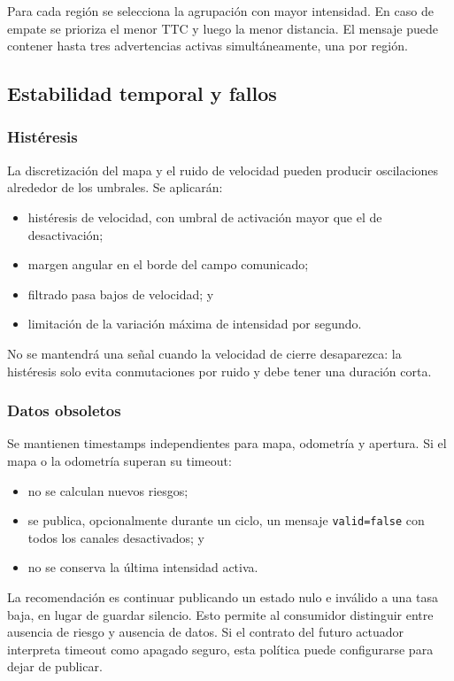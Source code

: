 Para cada región se selecciona la agrupación con mayor intensidad. En caso de
empate se prioriza el menor TTC y luego la menor distancia. El mensaje puede
contener hasta tres advertencias activas simultáneamente, una por región.

\subsection{Estabilidad temporal y fallos}
\label{subsec:sa-robustness}

\subsubsection{Histéresis}

La discretización del mapa y el ruido de velocidad pueden producir
oscilaciones alrededor de los umbrales. Se aplicarán:
%
\begin{itemize}
  \item histéresis de velocidad, con umbral de activación mayor que el de
    desactivación;
  \item margen angular en el borde del campo comunicado;
  \item filtrado pasa bajos de velocidad; y
  \item limitación de la variación máxima de intensidad por segundo.
\end{itemize}

No se mantendrá una señal cuando la velocidad de cierre desaparezca: la
histéresis solo evita conmutaciones por ruido y debe tener una duración corta.

\subsubsection{Datos obsoletos}

Se mantienen timestamps independientes para mapa, odometría y apertura. Si el
mapa o la odometría superan su timeout:
%
\begin{itemize}
  \item no se calculan nuevos riesgos;
  \item se publica, opcionalmente durante un ciclo, un mensaje
    \texttt{valid=false} con todos los canales desactivados; y
  \item no se conserva la última intensidad activa.
\end{itemize}

La recomendación es continuar publicando un estado nulo e inválido a una tasa
baja, en lugar de guardar silencio. Esto permite al consumidor distinguir
entre ausencia de riesgo y ausencia de datos. Si el contrato del futuro
actuador interpreta timeout como apagado seguro, esta política puede
configurarse para dejar de publicar.

